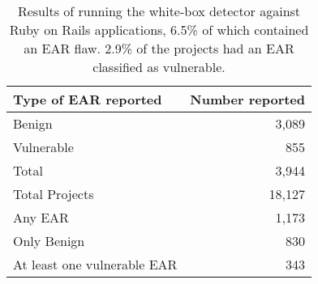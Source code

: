 \begin{table}[tb]
  \centering
  \begin{tabular}{lr}
    Type of EAR reported & Number reported \\
    \hline
    Benign & 3,089 \\
    Vulnerable & 855 \\
    Total & 3,944 \\
    \hline
    \hline
    Total Projects & 18,127 \\
    Any EAR & 1,173 \\
    Only Benign & 830 \\
    At least one vulnerable EAR & 343 \\
    \hline
  \end{tabular}
  \caption[Results of running white-box detector.]{Results of running the white-box detector against Ruby on
    Rails applications, 6.5\% of which contained an EAR flaw. 2.9\% of
    the projects had an EAR classified as vulnerable.}
\end{table}
